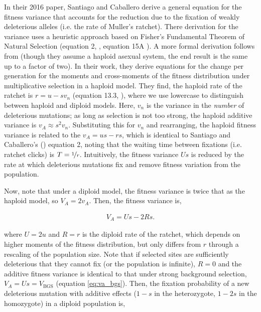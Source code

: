 \documentclass[11pt]{article}
\begin{document}

In their 2016 paper, Santiago and Caballero derive a general equation for the
fitness variance that accounts for the reduction due to the fixation of weakly
deleterious alleles (i.e. the rate of Muller's ratchet). There derivation for
the variance uses a heuristic approach based on Fisher's Fundamental Theorem of
Natural Selection (equation 2, \cite{Santiago2016-mu}, equation 15A
\cite{Garcia-Dorado2007-jj}). A more formal derivation follows from
\textcite{Higgs1995-xc} (though they assume a haploid asexual system, the end
result is the same up to a factor of two). In their work, they derive equations
for the change per generation for the moments and cross-moments of the fitness
distribution under multiplicative selection in a haploid model. They find, the
haploid rate of the ratchet is $r = u - s v_n$ (equation 13.3,
\cite{Higgs1995-xc}), where we use lowercase to distinguish between haploid and
diploid models. Here, $v_n$ is the variance in the \emph{number} of deleterious
mutations; as long as selection is not too strong, the haploid additive
variance is $v_{A} \approx s^2 v_n$. Substituting this for $v_n$ and
rearranging, the haploid fitness variance is related to the $v_A = us - rs$,
which is identical to Santiago and Caballero's (\citeyear{Santiago2016-mu})
equation 2, noting that the waiting time between fixations (i.e. ratchet
clicks) is $T = \nicefrac{1}{r}$. Intuitively, the fitness variance $Us$ is
reduced by the rate at which deleterious mutations fix and remove fitness
variation from the population.

Now, note that under a diploid model, the fitness variance is twice that as the
haploid model, so $V_A = 2 v_A$. Then, the fitness variance is,

\begin{align}
  \label{supp-eq:Va}
  V_{A} = Us - 2Rs. 
\end{align}

where $U = 2u$ and $R=r$ is the diploid rate of the ratchet, which depends on
higher moments of the fitness distribution, but only differs from $r$ through a
rescaling of the population size. Note that if selected sites are sufficiently
deleterious that they cannot fix (or the population is infinite), $R=0$ and the
additive fitness variance is identical to that under strong background
selection, $V_A = Us = V_\text{BGS}$ (equation \eqref{eq:va_bgs}). Then, the
fixation probability of a new deleterious mutation with additive effects ($1-s$
in the heterozygote, $1-2s$ in the homozygote) in a diploid population is,
\end{document}
